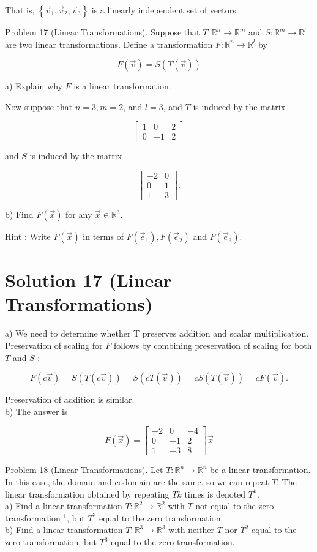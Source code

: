 \documentclass[10pt]{article}
\begin{document}
That is, $\left\{\vec{v}_{1}, \vec{v}_{2}, \vec{v}_{3}\right\}$ is a linearly independent set of vectors.

Problem 17 (Linear Transformations). Suppose that $T: \mathbb{R}^{n} \rightarrow \mathbb{R}^{m}$ and $S: \mathbb{R}^{m} \rightarrow \mathbb{R}^{l}$ are two linear transformations. Define a transformation $F: \mathbb{R}^{n} \rightarrow \mathbb{R}^{l}$ by

$$
F(\vec{v})=S(T(\vec{v}))
$$

a) Explain why $F$ is a linear transformation.

Now suppose that $n=3, m=2$, and $l=3$, and $T$ is induced by the matrix

$$
\left[\begin{array}{ccc}
1 & 0 & 2 \\
0 & -1 & 2
\end{array}\right]
$$

and $S$ is induced by the matrix

$$
\left[\begin{array}{cc}
-2 & 0 \\
0 & 1 \\
1 & 3
\end{array}\right] .
$$

b) Find $F(\vec{x})$ for any $\vec{x} \in \mathbb{R}^{3}$.

Hint : Write $F(\vec{x})$ in terms of $F\left(\vec{e}_{1}\right), F\left(\vec{e}_{2}\right)$ and $F\left(\vec{e}_{3}\right)$.

\section*{Solution 17 (Linear Transformations)}
a) We need to determine whether T preserves addition and scalar multiplication. Preservation of scaling for $F$ follows by combining preservation of scaling for both $T$ and $S$ :

$$
F(c \vec{v})=S(T(c \vec{v}))=S(c T(\vec{v}))=c S(T(\vec{v}))=c F(\vec{v}) .
$$

Preservation of addition is similar.\\
b) The answer is

$$
F(\vec{x})=\left[\begin{array}{ccc}
-2 & 0 & -4 \\
0 & -1 & 2 \\
1 & -3 & 8
\end{array}\right] \vec{x}
$$

Problem 18 (Linear Transformations). Let $T: \mathbb{R}^{n} \rightarrow \mathbb{R}^{n}$ be a linear transformation. In this case, the domain and codomain are the same, so we can repeat $T$. The linear transformation obtained by repeating $T k$ times is denoted $T^{k}$.\\
a) Find a linear transformation $T: \mathbb{R}^{2} \rightarrow \mathbb{R}^{2}$ with $T$ not equal to the zero transformation ${ }^{1}$, but $T^{2}$ equal to the zero transformation.\\
b) Find a linear transformation $T: \mathbb{R}^{3} \rightarrow \mathbb{R}^{3}$ with neither $T$ nor $T^{2}$ equal to the zero transformation, but $T^{3}$ equal to the zero transformation.
\end{document}
